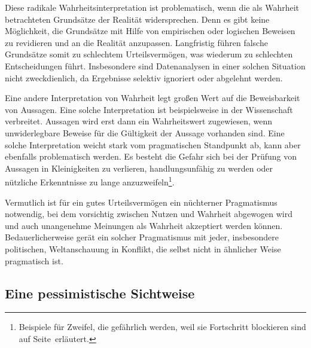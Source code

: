 Diese radikale Wahrheitsinterpretation ist problematisch, wenn die als Wahrheit
betrachteten Grundsätze der Realität widersprechen. Denn es gibt keine
Möglichkeit, die Grundsätze mit Hilfe von empirischen oder logischen Beweisen
zu revidieren und an die Realität anzupassen. Langfristig führen falsche
Grundsätze somit zu schlechtem Urteilsvermögen, was wiederum zu schlechten
Entscheidungen führt. Insbesondere sind Datenanalysen in einer solchen Situation
nicht zweckdienlich, da Ergebnisse selektiv ignoriert oder abgelehnt werden.

Eine andere Interpretation von Wahrheit legt großen Wert auf die Beweisbarkeit
von Aussagen. Eine solche Interpretation ist beispielsweise in der Wissenschaft
verbreitet. Aussagen wird erst dann ein Wahrheitswert zugewiesen, wenn
unwiderlegbare Beweise für die Gültigkeit der Aussage vorhanden sind. Eine
solche Interpretation weicht stark vom pragmatischen Standpunkt ab, kann aber
ebenfalls problematisch werden. Es besteht die Gefahr sich bei der Prüfung von
Aussagen in Kleinigkeiten zu verlieren, handlungsunfähig zu werden oder
nützliche Erkenntnisse zu lange anzuzweifeln\footnote{
Beispiele für Zweifel, die gefährlich werden, weil sie Fortschritt blockieren
sind auf Seite~\xcom erläutert.
}.

Vermutlich ist für ein gutes Urteilsvermögen ein nüchterner Pragmatismus
notwendig, bei dem vorsichtig zwischen Nutzen und Wahrheit abgewogen wird und
auch unangenehme Meinungen als Wahrheit akzeptiert werden können.
Bedauerlicherweise gerät ein solcher Pragmatismus mit jeder, insbesondere
politischen, Weltanschauung in Konflikt, die selbst nicht in ähnlicher Weise
pragmatisch ist.


\subsection{Eine pessimistische Sichtweise}





